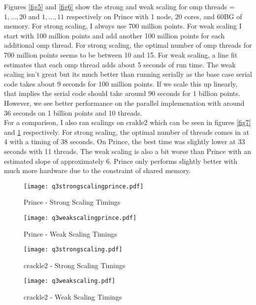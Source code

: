 \documentclass[10pt]{article}
\begin{document}
Figures \ref{fig5} and \ref{fig6} show the strong and weak scaling for omp threads = $1,...,20$ and $1,...,11$ respectively on Prince with 1 node, 20 cores, and 60BG of memory. For strong scaling, I always use 700 million points. For weak scaling I start with 100 million points and add another 100 million points for each additional omp thread. For strong scaling, the optimal number of omp threads for 700 million points seems to be between 10 and 15. For weak scaling, a line fit estimates that each omp thread adds about 5 seconds of run time. The weak scaling isn't great but its much better than running serially as the base case serial code takes about 9 seconds for 100 million points. If we scale this up linearly, that implies the serial code should take around 90 seconds for 1 billion points. However, we see better performance on the parallel implemenation with around 36 seconds on 1 billion points and 10 threads.\\

For a comparison, I also ran scalings on crakle2 which can be seen in figures \ref{fig7} and \ref{fig8} respectively. For strong scaling, the optimal number of threads comes in at 4 with a timing of 38 seconds. On Prince, the best time was slightly lower at 33 seconds with 11 threads. The weak scaling is also a bit worse than Prince with an estimated slope of approximately 6. Prince only performs slightly better with much more hardware due to the constraint of shared memory.

\lipsum

\begin{figure}[!h]
    \centering
    \begin{minipage}{0.45\textwidth}
        \centering
        \texttt{[image: q3strongscalingprince.pdf]} %
        \caption{Prince - Strong Scaling Timings}
        \label{fig5}
    \end{minipage}\hfill
         \begin{minipage}{0.45\textwidth}
        \centering
        \texttt{[image: q3weakscalingprince.pdf]} %
        \caption{Prince - Weak Scaling Timings}
        \label{fig6}
    \end{minipage}

    \centering
    \begin{minipage}{0.45\textwidth}
        \centering
        \texttt{[image: q3strongscaling.pdf]} %
        \caption{crackle2 - Strong Scaling Timings}
        \label{fig7}
    \end{minipage}\hfill
         \begin{minipage}{0.45\textwidth}
        \centering
        \texttt{[image: q3weakscaling.pdf]} %
        \caption{crackle2 - Weak Scaling Timings}
        \label{fig8}
    \end{minipage}
\end{figure}

\lipsum
\end{document}
